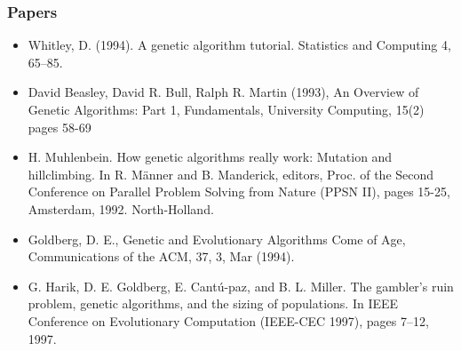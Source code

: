 \subsubsection{Papers}

\begin{itemize}
	\item Whitley, D. (1994). A genetic algorithm tutorial. Statistics and Computing 4, 65–85.
	\item David Beasley,  David R. Bull,  Ralph R. Martin (1993), An Overview of Genetic Algorithms: Part 1, Fundamentals, University Computing, 15(2) pages 58-69
	\item H. Muhlenbein. How genetic algorithms really work: Mutation and hillclimbing. In R. Männer and B. Manderick, editors, Proc. of the Second Conference on Parallel Problem Solving from Nature (PPSN II), pages 15-25, Amsterdam, 1992. North-Holland.
	\item Goldberg, D. E., Genetic and Evolutionary Algorithms Come of Age, Communications of the ACM, 37, 3, Mar (1994). 
	\item G. Harik, D. E. Goldberg, E. Cantú-paz, and B. L. Miller. The gambler's ruin problem, genetic algorithms, and the sizing of populations. In IEEE Conference on Evolutionary Computation (IEEE-CEC 1997), pages 7--12, 1997.
\end{itemize}